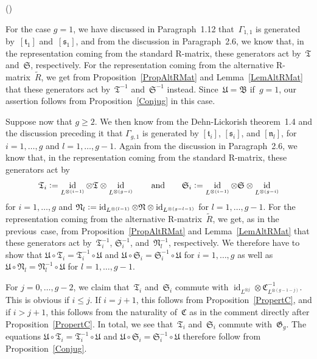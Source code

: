 \documentclass[12pt]{article}
\makeatletter
\newcounter{num}
\newenvironment{pflist}{\begin{list}{(\arabic{num})}{\usecounter{num} \leftmargin0cm \itemindent5pt}}{\end{list}}
\theoremstyle{definition}
\theoremstyle{break}
\renewenvironment{proof}[1][\proofname]{\par
\vspace{-5pt}%
\pushQED{\qed}%
\normalfont
\topsep0pt \partopsep0pt %
\trivlist
\item[\hskip\labelsep
\bfseries
#1\@addpunct{.}]\ignorespaces
}{%
\popQED\endtrivlist\@endpefalse
\addvspace{6pt plus 6pt} %
}
\DeclareMathOperator\id{id}
\newcommand{\fB}{\mathfrak{B}}
\newcommand{\fC}{\mathfrak{C}}
\newcommand{\fS}{\mathfrak{S}}
\newcommand{\fT}{\mathfrak{T}}
\newcommand{\fN}{\mathfrak{N}}
\newcommand{\fG}{\mathfrak{G}}
\newcommand{\fU}{\mathfrak{U}}
\newcommand{\fs}{\mathfrak{s}}
\newcommand{\ft}{\mathfrak{t}}
\newcommand{\fn}{\mathfrak{n}}
\renewcommand{\1}{\mathbbm{1}}
\newcommand{\ot}{\mathbin{\otimes}}
\newcommand{\deq}{\vcentcolon =}
\makeatother
\begin{document}
\begin{proof}
\begin{pflist}
\item
For the case $g=1$, we have discussed in Paragraph~1.12 that~$\Gamma_{1,1}$ is generated by~$[\ft_1]$ and~$[\fs_1]$, and from the discussion in Paragraph~2.6, we know that, in the representation coming from the standard R-matrix, these generators act by~$\fT$ and~$\fS$, respectively. For the representation coming from the alternative R-matrix~$\tilde{R}$, we get from Proposition~\ref{PropAltRMat} and Lemma~\ref{LemAltRMat} that these generators act by~$\fT^{-1}$ and~$\fS^{-1}$ instead. Since~$\fU = \fB$ if~$g=1$, our assertion follows from Proposition~\ref{Conjug} in this case.

\item
Suppose now that $g \ge 2$. We then know from the Dehn-Lickorish theorem~1.4 and the discussion preceding it that $\Gamma_{g,1}$ is generated by $[\ft_i]$, $[\fs_i]$, and $[\fn_l]$, for $i=1,\dots,g$ and \mbox{$l=1,\dots,g-1$}. Again from the discussion in Paragraph~2.6, we know that, in the representation coming from the standard R-matrix, these generators act by
\[\fT_i \deq \id_{L^{\ot (i-1)}} \ot \fT \ot \id_{L^{\ot (g-i)}}
\qquad \text{and} \qquad
\fS_i \deq \id_{L^{\ot (i-1)}} \ot \fS \ot \id_{L^{\ot (g-i)}}\]
for $i=1,\ldots,g$ and
$\fN_l \deq \id_{L^{\ot (l-1)}} \ot \fN \ot \id_{L^{\ot (g-l-1)}}$
for $l=1,\ldots,g-1$. For the representation coming from the alternative R-matrix~$\tilde{R}$, we get, as in the previous~case, from Proposition~\ref{PropAltRMat} and Lemma~\ref{LemAltRMat} that these generators act by~$\fT_i^{-1}$, $\fS_i^{-1}$, and~$\fN_l^{-1}$, respectively.
We therefore have to show that
$\fU \circ \fT_i = \fT_i^{-1} \circ \fU$ and
$\fU \circ \fS_i = \fS_i^{-1} \circ \fU$ for $i=1,\ldots,g$ as well as
$\fU \circ \fN_l = \fN_l^{-1} \circ \fU$
for $l=1,\ldots,g-1$.

\item
For $j=0,\dots,g-2$, we claim that~$\fT_i$ and~$\fS_i$ commute with
$\id_{L^{\ot j}} \ot \fC_{L^{\ot (g-1-j)}}^{-1}$. This is obvious if $i \le j$. If $i=j+1$, this follows from Proposition~\ref{PropertC}, and if $i>j+1$, this follows from the naturality of~$\fC$ as in the comment directly after Proposition~\ref{PropertC}. In total, we see that~$\fT_i$ and~$\fS_i$ commute with~$\fG_g$. The equations $\fU \circ \fT_i = \fT_i^{-1} \circ \fU$ and
$\fU \circ \fS_i = \fS_i^{-1} \circ \fU$ therefore follow from Proposition~\ref{Conjug}.


\end{pflist}
\end{proof}
\end{document}
